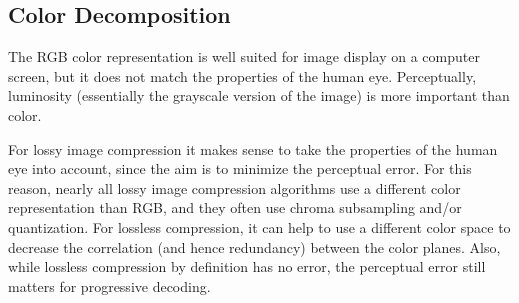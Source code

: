 \documentclass[a4paper,USenglish]{lipics}
\begin{document}
\subsection{Color Decomposition}

The RGB color representation is well suited for image display on a computer screen, but it does not
match the properties of the human eye. Perceptually, luminosity (essentially the grayscale version of the image)
is more important than color.

For lossy image compression it makes sense to take the properties of the human eye into account,
since the aim is to minimize the perceptual error. For this reason, nearly all lossy image
compression algorithms use a different color representation than RGB, and they often use chroma subsampling
and/or quantization.
For lossless compression, it can help to use a different color space to decrease the correlation (and hence redundancy)
between the color planes. Also, while lossless compression by definition has no error,
the perceptual error still matters for progressive decoding.
\end{document}
